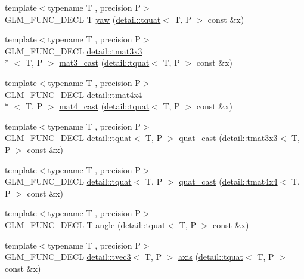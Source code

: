 \begin{DoxyCompactItemize}
\item 
{\footnotesize template$<$typename T , precision P$>$ }\\G\-L\-M\-\_\-\-F\-U\-N\-C\-\_\-\-D\-E\-C\-L T \hyperlink{group__gtc__quaternion_ga1de7653ddf380ff06d2300eea831664c}{yaw} (\hyperlink{structglm_1_1detail_1_1tquat}{detail\-::tquat}$<$ T, P $>$ const \&x)
\item 
{\footnotesize template$<$typename T , precision P$>$ }\\G\-L\-M\-\_\-\-F\-U\-N\-C\-\_\-\-D\-E\-C\-L \hyperlink{structglm_1_1detail_1_1tmat3x3}{detail\-::tmat3x3}\\*
$<$ T, P $>$ \hyperlink{group__gtc__quaternion_ga65257c3494022ad80a50ce11da95049d}{mat3\-\_\-cast} (\hyperlink{structglm_1_1detail_1_1tquat}{detail\-::tquat}$<$ T, P $>$ const \&x)
\item 
{\footnotesize template$<$typename T , precision P$>$ }\\G\-L\-M\-\_\-\-F\-U\-N\-C\-\_\-\-D\-E\-C\-L \hyperlink{structglm_1_1detail_1_1tmat4x4}{detail\-::tmat4x4}\\*
$<$ T, P $>$ \hyperlink{group__gtc__quaternion_gafc4e34c836f7ccb5f3bb2a0373c831e0}{mat4\-\_\-cast} (\hyperlink{structglm_1_1detail_1_1tquat}{detail\-::tquat}$<$ T, P $>$ const \&x)
\item 
{\footnotesize template$<$typename T , precision P$>$ }\\G\-L\-M\-\_\-\-F\-U\-N\-C\-\_\-\-D\-E\-C\-L \hyperlink{structglm_1_1detail_1_1tquat}{detail\-::tquat}$<$ T, P $>$ \hyperlink{group__gtc__quaternion_gafb826745dedb1760100bbd25d0f63fde}{quat\-\_\-cast} (\hyperlink{structglm_1_1detail_1_1tmat3x3}{detail\-::tmat3x3}$<$ T, P $>$ const \&x)
\item 
{\footnotesize template$<$typename T , precision P$>$ }\\G\-L\-M\-\_\-\-F\-U\-N\-C\-\_\-\-D\-E\-C\-L \hyperlink{structglm_1_1detail_1_1tquat}{detail\-::tquat}$<$ T, P $>$ \hyperlink{group__gtc__quaternion_ga385af22ef1a45c4464ddd28b80d5ce18}{quat\-\_\-cast} (\hyperlink{structglm_1_1detail_1_1tmat4x4}{detail\-::tmat4x4}$<$ T, P $>$ const \&x)
\item 
{\footnotesize template$<$typename T , precision P$>$ }\\G\-L\-M\-\_\-\-F\-U\-N\-C\-\_\-\-D\-E\-C\-L T \hyperlink{group__gtc__quaternion_ga23a3fc7ada5bbb665ff84c92c6e0542c}{angle} (\hyperlink{structglm_1_1detail_1_1tquat}{detail\-::tquat}$<$ T, P $>$ const \&x)
\item 
{\footnotesize template$<$typename T , precision P$>$ }\\G\-L\-M\-\_\-\-F\-U\-N\-C\-\_\-\-D\-E\-C\-L \hyperlink{structglm_1_1detail_1_1tvec3}{detail\-::tvec3}$<$ T, P $>$ \hyperlink{group__gtc__quaternion_ga8eef9f8c3f2e4836dccf09df975b20fb}{axis} (\hyperlink{structglm_1_1detail_1_1tquat}{detail\-::tquat}$<$ T, P $>$ const \&x)

\end{DoxyCompactItemize}
